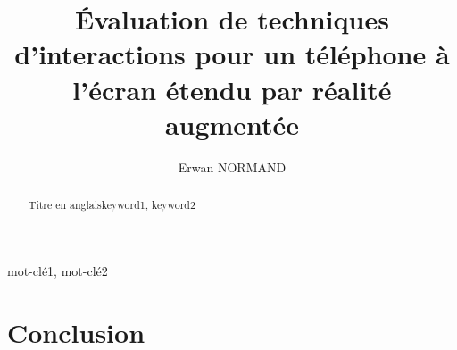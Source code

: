 \documentclass[letterpaper, twoside, 12pt,%
  memoire, francais, creativecommons, hyperref, withAlgo2e%
]{thETS}
\title{Évaluation de techniques d'interactions pour un téléphone à l'écran étendu par réalité augmentée}
\author{Erwan NORMAND}
\begin{document}

\maketitle
\presentjury

%  

\begin{remerciements}
  
\end{remerciements}

\begin{sommaire}{mot-clé1, mot-clé2}
  
\end{sommaire}

\begin{abstract}{Titre en anglais}{keyword1, keyword2}
  
\end{abstract}

\tableofcontents
\listoftables
\listoffigures

\begin{listofabbr}[3cm]
  
\end{listofabbr}

%  

\cleardoublepage
{}
\reversemarginpar

\begin{introduction}
  
\end{introduction}






\chapter*{Conclusion}


\appendix


\newpage
\begin{spacing}{1}
  \nocite{*}
  
  
\end{spacing}
\end{document}
